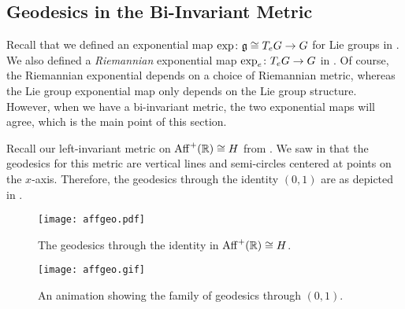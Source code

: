 \subsection{Geodesics in the Bi-Invariant Metric}

Recall that we defined an exponential map $\exp \colon\thinspace\! \mathfrak{g} \cong T_e G \to G$ for Lie groups in . We also defined a \emph{Riemannian} exponential map $\exp_e \colon\thinspace\! T_e G \to G$ in . Of course, the Riemannian exponential depends on a choice of Riemannian metric, whereas the Lie group exponential map only depends on the Lie group structure. However, when we have a bi-invariant metric, the two exponential maps will agree, which is the main point of this section.

\begin{example}
	Recall our left-invariant metric on $\operatorname{Aff}^+(\mathbb{R}) \cong H$ from . We saw in  that the geodesics for this metric are vertical lines and semi-circles centered at points on the $x$-axis. Therefore, the geodesics through the identity $(0,1)$ are as depicted in .
	
	\begin{figure}[htbp]
		\centering
			\texttt{[image: affgeo.pdf]}
		\caption{The geodesics through the identity in $\operatorname{Aff}^+(\mathbb{R}) \cong H$.}
		\label{fig:identity geodesics in aff}
	\end{figure}

	\ifplastex
	\begin{figure}[htbp]
		\centering
			\texttt{[image: affgeo.gif]}
		\caption{An animation showing the family of geodesics through $(0,1)$.}
		\label{fig:identity geodesics in aff animation}
	\end{figure}
	\fi
	

\end{example}
